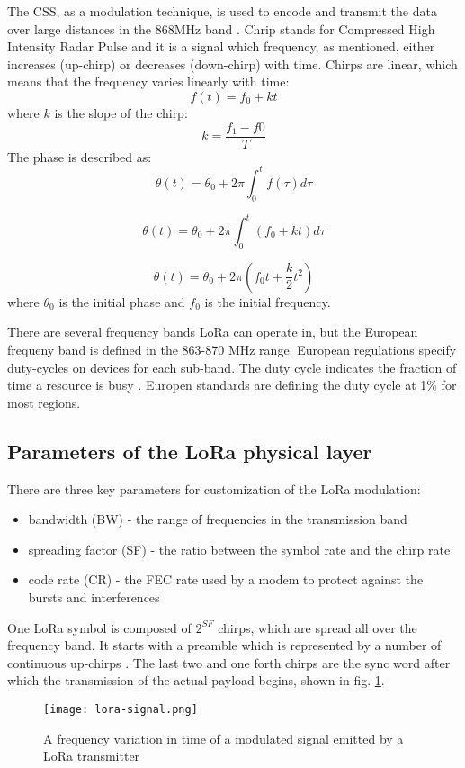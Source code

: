 The CSS, as a modulation technique, is used to encode and transmit the data over large distances in the 868MHz band \cite{Reynders_CSS}. 
Chrip stands for Compressed High Intensity Radar Pulse and it is a signal which frequency, as mentioned, either increases (up-chirp) or decreases (down-chirp) with time.
Chirps are linear, which means that the frequency varies linearly with time:
\begin{equation}
    f(t) = f_{0} + kt
\end{equation}
where $ k $ is the slope of the chirp:
\begin{equation}
    k = \frac{f_{1} - f{0}}{T}
\end{equation}
The phase is described as:
$$ \theta (t) = \theta_{0} + 2\pi \int_{0}^{t}f(\tau)d\tau $$

$$ \theta (t) = \theta_{0} + 2\pi \int_{0}^{t}(f_{0} + kt) d\tau $$

\begin{equation}
    \theta(t) = \theta_{0} + 2\pi (f_{0}t + \frac{k}{2}t^{2})
\end{equation}
where $ \theta_{0} $ is the initial phase and $ f_{0} $ is the initial frequency.

There are several frequency bands LoRa can operate in, but the European frequeny band is defined in the 863-870 MHz range.
European regulations specify duty-cycles on devices for each sub-band.
The duty cycle indicates the fraction of time a resource is busy \cite{TTN}. 
Europen standards are defining the duty cycle at 1\% for most regions. 

\subsection{Parameters of the LoRa physical layer}
There are three key parameters for customization of the LoRa modulation:
\begin{itemize}
    \item bandwidth (BW) - the range of frequencies in the transmission band
    \item spreading factor (SF) - the ratio between the symbol rate and the chirp rate
    \item code rate (CR) - the FEC rate used by a modem to protect against the bursts and interferences
\end{itemize}
One LoRa symbol is composed of $ 2^{SF} $ chirps, which are spread all over the frequency band.
It starts with a preamble which is represented by a number of continuous up-chirps \cite{Knight}.
The last two and one forth chirps are the sync word after which the transmission of the actual payload begins, shown in fig. \ref{fig:lora_signal}.
\begin{figure}[h]
    \centering
    \texttt{[image: lora-signal.png]}
    \caption{A frequency variation in time of a modulated signal emitted by a LoRa transmitter \cite{Aloys_LoRa}}
    \label{fig:lora_signal}
\end{figure}

